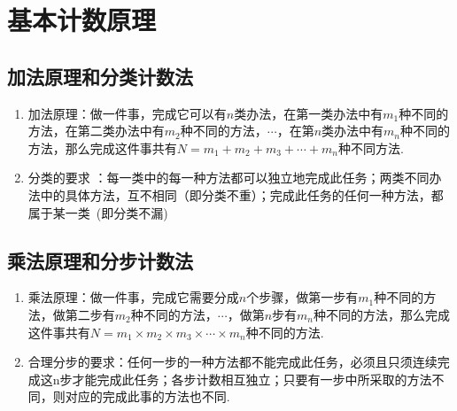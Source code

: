 \documentclass[marginline,noindent,answers,adobefonts]{BHCexam}
\begin{document}
\renewcommand{\theexample}{\arabic{example}}
\newenvironment{example}[1][]{\refstepcounter{example}\noindent\textbf{例 \theexample:\ #1} }{\hspace{\stretch{1}}\par  }%

\newtheorem{theroem}{\hspace{2em }定理}[section]
\newcommand{\lt}[1]{\noindent\textbf{例：}#1\par}
\newcommand{\jd}[1]{\noindent \textbf{解：}#1\par}

\maketitle
\tableofcontents
\newpage
\section{基本计数原理}
\subsection{加法原理和分类计数法}
\begin{enumerate}[1)]
\item 加法原理：做一件事，完成它可以有$n$类办法，在第一类办法中有$m_1$种不同的方法，在第二类办法中有$m_2$种不同的方法，$ \cdots $，在第$n$类办法中有$m_n$种不同的方法，那么完成这件事共有$N=m_1+m_2+m_3+\cdots +m_n$种不同方法.
\item 分类的要求 ：每一类中的每一种方法都可以独立地完成此任务；两类不同办法中的具体方法，互不相同（即分类不重）；完成此任务的任何一种方法，都属于某一类~(即分类不漏)
\end{enumerate}
\subsection{乘法原理和分步计数法}
\begin{enumerate}[1)]
\item 乘法原理：做一件事，完成它需要分成$n$个步骤，做第一步有$m_1$种不同的方法，做第二步有$m_2$种不同的方法，$ \cdots $，做第$n$步有$m_n$种不同的方法，那么完成这件事共有$N=m_1\times m_2\times m_3\times \cdots \times m_n$种不同的方法.
\item 合理分步的要求：任何一步的一种方法都不能完成此任务，必须且只须连续完成这n步才能完成此任务；各步计数相互独立；只要有一步中所采取的方法不同，则对应的完成此事的方法也不同.
\end{enumerate}
\end{document}
